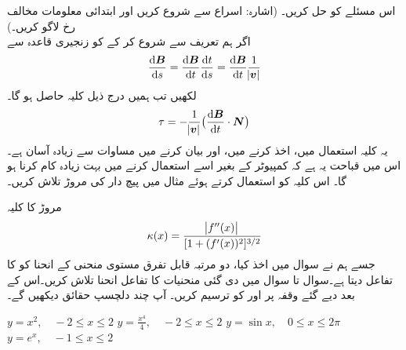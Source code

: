 اس مسئلے  کو حل کریں۔ (اشارہ:  اسراع  سے شروع کریں اور ابتدائی معلومات مخالف رخ لاگو کریں۔)
\\
اگر ہم تعریف   سے شروع کر کے  کو زنجیری قاعدہ سے
\begin{align*}
\frac{\dif\kvec{B}}{\dif s}=\frac{\dif\kvec{B}}{\dif t}\frac{\dif t}{\dif s}=\frac{\dif \kvec{B}}{\dif t}\frac{1}{\abs{\kvec{v}}}
\end{align*}
لکھیں تب ہمیں درج ذیل کلیہ حاصل ہو گا۔
\begin{align*}
\tau=-\frac{1}{\abs{\kvec{v}}}\big(\frac{\dif\kvec{B}}{\dif t}\cdot\kvec{N}\big)
\end{align*}
یہ کلیہ  استعمال میں، اخذ کرنے میں،  اور بیان کرنے میں  مساوات   سے زیادہ آسان ہے۔ اس میں قباحت  یہ ہے کہ کمپیوٹر کے بغیر  اسے استعمال کرنے میں بہت زیادہ کام کرنا ہو گا۔ اس کلیہ  کو استعمال کرتے ہوئے  مثال میں پیچ دار کی مروڑ تلاش کریں۔

مروڑ کا  کلیہ
\begin{align*}
\kappa(x)=\frac{\abs{f''(x)}}{[1+(f'(x))^2]^{3/2}}
\end{align*} 
جسے ہم نے سوال  میں اخذ کیا،  دو مرتبہ  قابل تفرق مستوی منحنی  کے انحنا  کو  کا تفاعل دیتا ہے۔سوال  تا سوال  میں دی گئی منحنیات کا تفاعل انحنا تلاش کریں۔اس کے بعد دیے گئے وقفہ پر  اور  کو ترسیم کریں۔ آپ چند دلچسپ حقائق دیکھیں گے۔

$y=x^2,\quad -2\le x\le 2$
$y=\tfrac{x^4}{4},\quad -2\le x\le 2$
$y=\sin x,\quad 0\le x\le 2\pi$
$y=e^x,\quad -1\le x\le 2$

